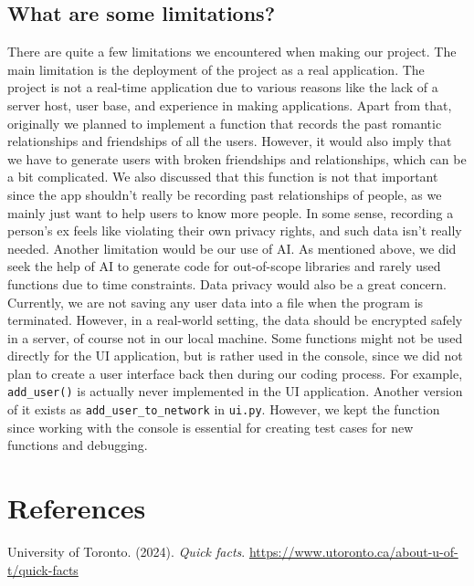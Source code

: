 \documentclass[fontsize=11pt]{article}
\begin{document}
\subsection*{What are some limitations?}
There are quite a few limitations we encountered when making our project.
The main limitation is the deployment of the project as a real application. The project is not a real-time application due to various reasons like the lack of a server host, user base, and experience in making applications.
Apart from that, originally we planned to implement a function that records the past romantic relationships and friendships of all the users. However, it would also imply that we have to generate users with broken friendships and relationships, which can be a bit complicated. We also discussed that this function is not that important since the app shouldn't really be recording past relationships of people, as we mainly just want to help users to know more people. In some sense, recording a person's ex feels like violating their own privacy rights, and such data isn't really needed.
Another limitation would be our use of AI. As mentioned above, we did seek the help of AI to generate code for out-of-scope libraries and rarely used functions due to time constraints.
Data privacy would also be a great concern. Currently, we are not saving any user data into a file when the program is terminated. However, in a real-world setting, the data should be encrypted safely in a server, of course not in our local machine.
Some functions might not be used directly for the UI application, but is rather used in the console, since we did not plan to create a user interface back then during our coding process. For example, \texttt{add\_user()} is actually never implemented in the UI application. Another version of it exists as \texttt{add\_user\_to\_network} in \texttt{ui.py}. However, we kept the function since working with the console is essential for creating test cases for new functions and debugging.



\section{References}
University of Toronto. (2024). \textit{Quick facts}.
\url{https://www.utoronto.ca/about-u-of-t/quick-facts}


\end{document}
